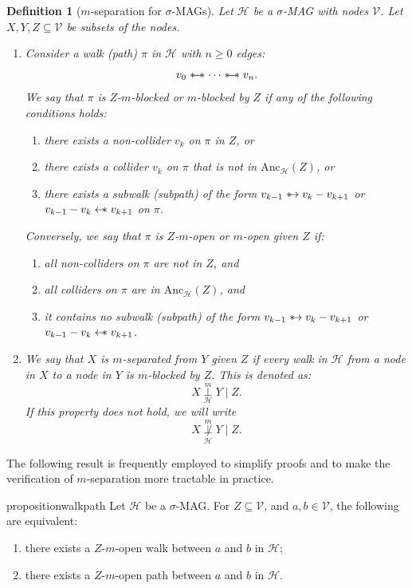 \documentclass[accepted]{uai2025} %
\newtheorem{definition}{Definition}
\newcommand{\anc}{\text{Anc}}
\newcommand{\hus}{\mathrel{{\leftarrow\mkern-11mu\ast}}}
\newcommand{\suh}{\mathrel{{\ast\mkern-11mu\to}}}
\newcommand{\sus}{\mathrel{{\ast\mkern-11mu\relbar\mkern-9mu\relbar\mkern-11mu\ast}}}
\begin{document}
\begin{definition}[$m$-separation for $\sigma$-MAGs]
Let $\mathcal{H}$ be a $\sigma$-MAG with nodes $\mathcal{V}$. Let $X,Y,Z\subseteq  \mathcal{V}$ be subsets of the nodes.
\begin{enumerate}
    \item Consider a walk (path) $\pi$ in $\mathcal{H}$ with $n\geq 0$ edges:
      $$v_0\sus \cdots\sus v_n.$$
    We say that $\pi$ is \emph{$Z$-$m$-blocked} or \emph{$m$-blocked by $Z$} if any of the following conditions holds:
    \begin{enumerate}
        \item there exists a non-collider $v_k$ on $\pi$ in $Z$, or
        \item there exists a collider $v_k$ on $\pi$ that is not in $\anc_\mathcal{H}(Z)$, or
        \item there exists a subwalk (subpath) of the form \( v_{k-1} \suh v_k - v_{k+1} \) or \( v_{k-1} - v_k \hus  v_{k+1} \) on $\pi$.
    \end{enumerate}
    Conversely, we say that $\pi$ is \emph{$Z$-$m$-open} or \emph{$m$-open given $Z$} if:
    \begin{enumerate}
        \item all non-colliders on $\pi$ are not in $Z$, and
        \item all colliders on $\pi$ are in $\anc_\mathcal{H}(Z)$, and
        \item it contains no subwalk (subpath) of the form \( v_{k-1} \suh v_k - v_{k+1} \) or \( v_{k-1} - v_k \hus  v_{k+1} \).
    \end{enumerate}
    \item We say that \emph{$X$ is $m$-separated from $Y$ given $Z$} if every walk in $\mathcal{H}$ from a node in $X$ to a node in $Y$ is $m$-blocked by $Z$. This is denoted as:
    $$
    X\overset{m}{\underset{\mathcal{H}}{\perp}} Y\mid Z.
    $$
    If this property does not hold, we will write
    $$
    X\overset{m}{\underset{\mathcal{H}}{\not\perp}} Y\mid Z.
    $$
\end{enumerate}
\end{definition}

The following result is frequently employed to simplify proofs and to make the verification of \( m \)-separation more tractable in practice.

\begin{restatable}{proposition}{walkpath} \label{walk eq path}
Let $\mathcal{H}$ be a $\sigma$-MAG. For $Z\subseteq \mathcal{V}$, and $a,b\in\mathcal{V}$, the following are equivalent:
\begin{enumerate}
    \item there exists a $Z$-$m$-open walk between $a$ and $b$ in $\mathcal{H}$;
    \item there exists a $Z$-$m$-open path between $a$ and $b$ in $\mathcal{H}$.
\end{enumerate}
\end{restatable}
\end{document}

